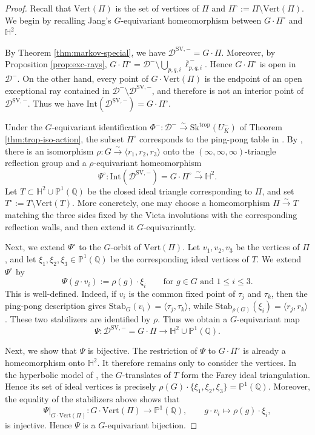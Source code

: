 \documentclass[reqno, 12pt]{amsart}
\theoremstyle{definition}
\newcommand{\bP}{\mathbb{P}}
\newcommand{\bQ}{\mathbb{Q}}
\newcommand{\cD}{\mathcal{D}}
\newcommand{\trop}{\mathrm{trop}}
\newcommand{\SV}{\mathrm{SV}}
\newcommand{\Sk}{\mathrm{Sk}}
\newcommand{\bH}{\mathbb{H}}
\newcommand{\Int}{\mathrm{Int}}
\newcommand{\VPi}{\mathrm{Vert}(\Pi)}
\newcommand{\Stab}{\mathrm{Stab}}
\numberwithin{equation}{section}
\begin{document}
\begin{proof}
Recall that $\VPi$ is the set of vertices of $\Pi$ and $\Pi^\circ:=\Pi\setminus \VPi$.  We begin by recalling Jang's
$G$-equivariant homeomorphism between $G\cdot\Pi^\circ$ and $\bH^2$.

By Theorem \ref{thm:markov-special}, we have
$\cD^{\SV,-}=G\cdot\Pi$.
Moreover, by Proposition \ref{prop:exc-rays},
$G\cdot\Pi^\circ
=
\cD^-\setminus \bigcup_{p,q,i}\overline{\ell}^{\, -}_{p,q,i}.$
Hence $G\cdot\Pi^\circ$ is open in $\cD^-$. On the other hand, every point
of $G\cdot\VPi$ is the endpoint of an open exceptional ray contained in
$\cD^-\setminus\cD^{\SV,-}$, and therefore is not an interior point of
$\cD^{\SV,-}$. Thus we have $
\Int(\cD^{\SV,-})
=
G\cdot\Pi^\circ$.

Under the $G$-equivariant identification
$\Phi^-:\cD^-\xrightarrow{\sim}\Sk^{\trop}(U^-_K)$
of Theorem \ref{thm:trop-iso-action}, the subset $\Pi^\circ$ corresponds to the ping-pong table in \cite[Section~9]{Jan23}. By \cite[Theorem~9.3]{Jan23}, there is
an isomorphism
$\rho:G\xrightarrow{\sim}\langle r_1,r_2,r_3\rangle$
onto the $(\infty,\infty,\infty)$-triangle reflection group and a
$\rho$-equivariant homeomorphism
\[    \Psi^\circ:\Int(\cD^{\SV,-})=G\cdot\Pi^\circ\xrightarrow{\sim}\bH^2.
\]
Let
$T\subset \bH^2\cup \bP^1(\bQ)$
be the closed ideal triangle corresponding to $\Pi$, and set $T^\circ:=T\setminus \mathrm{Vert}(T)$.
More concretely, one may choose a homeomorphism $\Pi\xrightarrow{\sim}T$ matching the three
sides fixed by the Vieta involutions with the corresponding reflection
walls, and then extend it $G$-equivariantly.

Next, we extend $\Psi^\circ$ to the $G$-orbit of $\VPi$.
Let $v_1,v_2,v_3$ be the vertices of $\Pi$, and let
$\xi_1,\xi_2,\xi_3\in\bP^1(\bQ)$ be the corresponding ideal vertices
of $T$. 
We extend $\Psi^\circ$ by
\[
    \Psi(g\cdot v_i):=\rho(g)\cdot\xi_i \qquad \textrm{for }
     g\in G\textrm{ and } 1\le i\le3.
\]
This is well-defined. Indeed, if $v_i$ is the common fixed point of
$\tau_j$ and $\tau_k$, then the ping-pong description gives
$\Stab_G(v_i)=\langle\tau_j,\tau_k\rangle$,
while $\Stab_{\rho(G)}(\xi_i)=\langle r_j,r_k\rangle$.
These two stabilizers are identified by $\rho$. Thus we obtain a
$G$-equivariant map
\[
    \Psi:\cD^{\SV,-}=G\cdot\Pi
    \to \bH^2\cup\bP^1(\bQ).
\]

Next, we show that $\Psi$ is bijective. 
The restriction of $\Psi$ to $G\cdot\Pi^\circ$ is already a
homeomorphism onto $\bH^2$. It therefore remains only to consider the
vertices. In the hyperbolic model of \cite[Section~9]{Jan23}, the
$G$-translates of $T$ form the Farey ideal triangulation.
Hence its set of ideal vertices is precisely
$    \rho(G)\cdot\{\xi_1,\xi_2,\xi_3\}=\bP^1(\bQ)$.
Moreover, the equality of the stabilizers above shows that
\[
   \Psi|_{G\cdot \VPi}: G\cdot \VPi\to\bP^1(\bQ),
    \qquad g\cdot v_i\mapsto\rho(g)\cdot\xi_i,
\]
is injective. Hence $\Psi$ is a $G$-equivariant bijection.


\end{proof}
\end{document}

